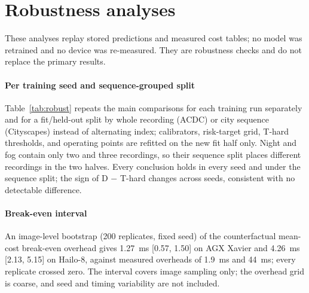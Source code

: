 \documentclass[a4paper,review,12pt]{elsarticle}
\newcommand{\miou}{mIoU}
\begin{document}
\begin{table}[H]
\centering
\caption{Condition-level configured and pooled D against policy A (median costs). W/T/L and mean $\Delta$ use fair cells; violation counts use all 24 cells per condition.}
\label{tab:router-condition}
\scriptsize
\setlength{\tabcolsep}{3.0pt}
\resizebox{\textwidth}{!}{%
%
}
\end{table}

\section{Robustness analyses}

These analyses replay stored predictions and measured cost tables; no model was retrained and no device was re-measured. They are robustness checks and do not replace the primary results.

\paragraph{Per training seed and sequence-grouped split} Table~\ref{tab:robust} repeats the main comparisons for each training run separately and for a fit/held-out split by whole recording (ACDC) or city sequence (Cityscapes) instead of alternating index; calibrators, risk-target grid, T-hard thresholds, and operating points are refitted on the new fit half only. Night and fog contain only two and three recordings, so their sequence split places different recordings in the two halves. Every conclusion holds in every seed and under the sequence split; the sign of D $-$ T-hard changes across seeds, consistent with no detectable difference.

\begin{table}[H]
\centering
\caption{Mean \miou{} difference (points) with the number of cells in parentheses, per training run (seeds 0--2), pooled (as in the manuscript), and with a sequence-grouped fit/held-out split. Static rows use route-feasible cells of the static-own-cost grid.}
\label{tab:robust}
\scriptsize
\setlength{\tabcolsep}{3pt}

\end{table}

\paragraph{Break-even interval} An image-level bootstrap (200 replicates, fixed seed) of the counterfactual mean-cost break-even overhead gives 1.27~ms [0.57, 1.50] on AGX Xavier and 4.26~ms [2.13, 5.15] on Hailo-8, against measured overheads of 1.9~ms and 44~ms; every replicate crossed zero. The interval covers image sampling only; the overhead grid is coarse, and seed and timing variability are not included.
\end{document}
